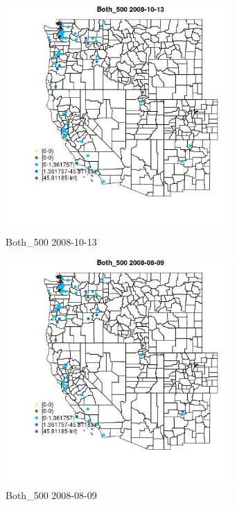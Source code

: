 \begin{figure} 
\centering  
\includegraphics[width=0.77\textwidth]{Code_Outputs/Report_ML_input_PM25_Step4_part_e_de_duplicated_aves_MapObsBoth_5002008-10-13.jpg} 
\caption{\label{fig:Report_ML_input_PM25_Step4_part_e_de_duplicated_avesMapObsBoth_5002008-10-13}Both_500 2008-10-13} 
\end{figure} 
 

\clearpage 

\begin{figure} 
\centering  
\includegraphics[width=0.77\textwidth]{Code_Outputs/Report_ML_input_PM25_Step4_part_e_de_duplicated_aves_MapObsBoth_5002008-08-09.jpg} 
\caption{\label{fig:Report_ML_input_PM25_Step4_part_e_de_duplicated_avesMapObsBoth_5002008-08-09}Both_500 2008-08-09} 
\end{figure} 
 

